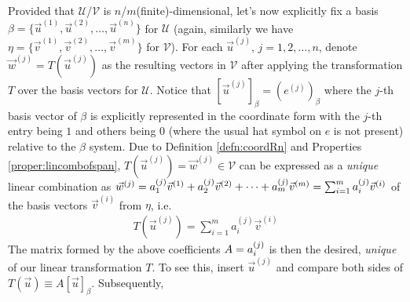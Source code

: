 Provided that $\mathcal{U}$/$\mathcal{V}$ is $n$/$m$(finite)-dimensional, let's now explicitly fix a basis $\mathcal{\beta} = \{\vec{u}^{(1)}, \vec{u}^{(2)}, \ldots, \vec{u}^{(n)}\}$ for $\mathcal{U}$ (again, similarly we have $\mathcal{\eta} = \{\vec{v}^{(1)}, \vec{v}^{(2)}, \ldots, \allowbreak \vec{v}^{(m)}\}$ for $\mathcal{V}$). For each $\vec{u}^{(j)}$, $j = 1,2,\ldots,n$, denote $\vec{w}^{(j)} = T(\vec{u}^{(j)})$ as the resulting vectors in $\mathcal{V}$ after applying the transformation $T$ over the basis vectors for $\mathcal{U}$. Notice that $[\vec{u}^{(j)}]_\beta = (e^{(j)})_\beta$ where the $j$-th basis vector of $\mathcal{\beta}$ is explicitly represented in the coordinate form with the $j$-th entry being $1$ and others being $0$ (where the usual hat symbol on $e$ is not present) relative to the $\mathcal{\beta}$ system. Due to Definition \ref{defn:coordRn} and Properties \ref{proper:lincombofspan}, $T(\vec{u}^{(j)}) = \vec{w}^{(j)} \in \mathcal{V}$ can be expressed as a \textit{unique} linear combination as $\vec{w}^{(j)} = \smash{a_1^{(j)}}\vec{v}^{(1)} + \smash{a_2^{(j)}}\vec{v}^{(2)} + \cdots + \smash{a_m^{(j)}}\vec{v}^{(m)} = \sum_{i=1}^{m} \smash{a_i^{(j)}}\vec{v}^{(i)}$ of the basis vectors $\vec{v}^{(i)}$ from $\mathcal{\eta}$, i.e.\ 
\begin{align}
T(\vec{u}^{(j)}) = \sum_{i=1}^{m} a_i^{(j)}\vec{v}^{(i)}
\end{align}
The matrix formed by the above coefficients $A = \smash{a_i^{(j)}}$ is then the desired, \textit{unique}  of our linear transformation $T$. To see this, insert $\vec{u}^{(j)}$ and compare both sides of $T(\vec{u}) \equiv A[\vec{u}]_\beta$. Subsequently,
